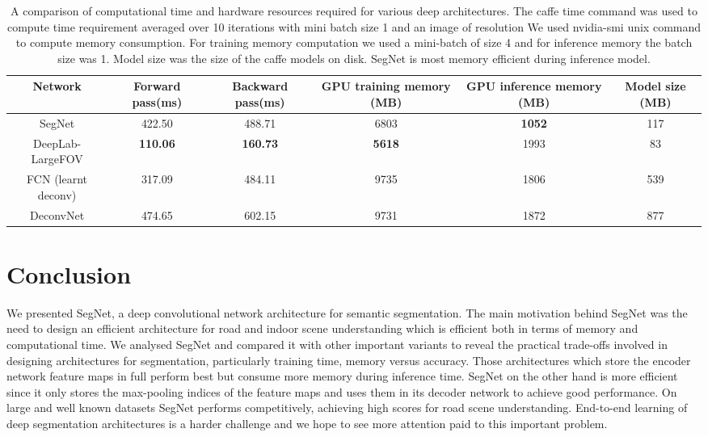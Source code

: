 \documentclass[10pt,journal,compsoc]{IEEEtran}
\begin{document}
\begin{table*}[t]
	\centering
	\tabcolsep=2pt
	\begin{tabular}{|c|c|c|c|c|c|}
		\hline
		Network       & Forward pass(ms) & Backward pass(ms) & GPU training memory (MB) & GPU inference memory (MB) & Model size (MB)  \\ \hline \hline
		SegNet  & 422.50 & 488.71 & 6803 & \textbf{1052} & 117\\ \hline
		DeepLab-LargeFOV \cite{liang2015semantic} & \textbf{110.06} & \textbf{160.73}& \textbf{5618} & 1993 & 83 \\ \hline
		FCN (learnt deconv)\cite{FCN} & 317.09 & 484.11 & 9735 & 1806 & 539 \\ \hline
		DeconvNet \cite{noh2015learning} & 474.65 & 602.15 & 9731 & 1872 & 877 \\ \hline
	\end{tabular}
	\vspace*{0.1cm}
	\caption{\footnotesize{A comparison of computational time and hardware resources required for various deep architectures. The caffe time command was used to compute time requirement averaged over 10 iterations with mini batch size 1 and an image of  resolution We used nvidia-smi unix command to compute memory consumption. For training memory computation we used a mini-batch of size 4 and for inference memory the batch size was 1. Model size was the size of the caffe models on disk. SegNet is most memory efficient during inference model.}}
	\label{TimeBenchmark}
\end{table*}

\section{Conclusion}
\label{Conclusion}
We presented SegNet, a deep convolutional network architecture for semantic segmentation. The main motivation behind SegNet was the need to design an efficient architecture for road and indoor scene understanding which is efficient both in terms of memory and computational time. We analysed SegNet and compared it with other important variants to reveal the practical trade-offs involved in designing architectures for segmentation, particularly training time, memory versus accuracy. Those architectures which store the encoder network feature maps in full perform best but consume more memory during inference time. SegNet on the other hand is more efficient since it only stores the max-pooling indices of the feature maps and uses them in its decoder network to achieve good performance. On large and well known datasets SegNet performs competitively, achieving high scores for road scene understanding. End-to-end learning of deep segmentation architectures is a harder challenge and we hope to see more attention paid to this important problem.
\end{document}
